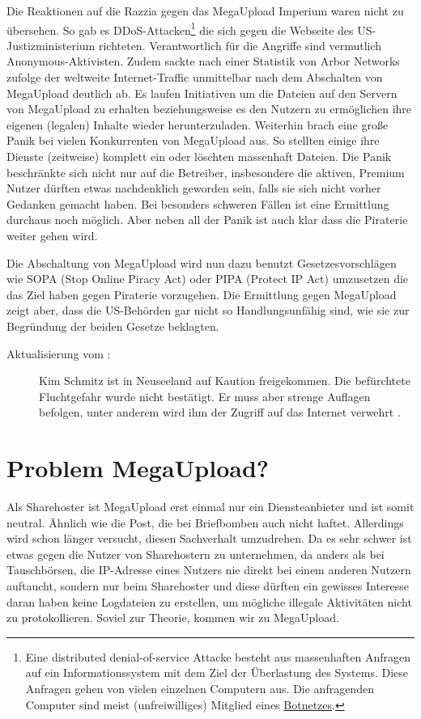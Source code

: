 Die Reaktionen auf die Razzia gegen das MegaUpload Imperium waren nicht zu übersehen. So gab es
DDoS-Attacken\footnote{Eine distributed denial-of-service Attacke besteht aus massenhaften Anfragen
auf ein Informationssystem mit dem Ziel der Überlastung des Systems. Diese Anfragen gehen von vielen
einzelnen Computern aus. Die anfragenden Computer sind meist (unfreiwilliges) Mitglied eines
\href{http://de.wikipedia.org/wiki/Botnet}{Botnetzes}.}
die sich gegen die Webseite des US-Justizministerium richteten. Verantwortlich für die Angriffe
sind vermutlich Anonymous-Aktivisten. Zudem
sackte nach einer Statistik von Arbor Networks zufolge der weltweite Internet-Traffic unmittelbar
nach dem Abschalten von MegaUpload deutlich ab\cite{arbornetworks:MegaUpload_shutdown_effect}.
Es laufen Initiativen um die Dateien auf den Servern
von MegaUpload zu erhalten beziehungsweise es den Nutzern zu ermöglichen ihre eigenen (legalen)
Inhalte wieder herunterzuladen. Weiterhin brach eine große Panik bei vielen Konkurrenten von
MegaUpload aus. So stellten einige ihre Dienste (zeitweise) komplett ein oder löschten massenhaft
Dateien. Die Panik
beschränkte sich nicht nur auf die Betreiber, insbesondere die aktiven, Premium Nutzer dürften etwas
nachdenklich geworden sein, falls sie sich nicht vorher Gedanken gemacht haben. Bei besonders
schweren Fällen ist eine Ermittlung durchaus noch möglich.
Aber neben all der Panik ist auch klar dass die Piraterie weiter gehen wird.

Die Abschaltung von MegaUpload wird nun dazu benutzt Gesetzesvorschlägen wie SOPA (Stop Online
Piracy Act) oder PIPA (Protect IP Act) umzusetzen die das Ziel haben gegen Piraterie vorzugehen.
Die Ermittlung gegen MegaUpload zeigt aber, dass die US-Behörden gar nicht so Handlungsunfähig
sind, wie sie zur Begründung der beiden Gesetze beklagten.

\begin{description}
	\item[Aktualisierung vom :] Kim Schmitz ist in Neuseeland auf Kaution
		freigekommen. Die befürchtete Fluchtgefahr wurde nicht bestätigt. Er muss aber strenge
		Auflagen befolgen, unter anderem wird ihm der Zugriff auf das Internet verwehrt
		\cite{golem:Kim_Frei,sueddeutsche:Kim_Frei}.
\end{description}

\section{Problem MegaUpload?}
Als Sharehoster ist MegaUpload erst einmal nur ein Diensteanbieter und ist somit neutral. Ähnlich
wie die Post, die bei Briefbomben auch nicht haftet. Allerdings wird schon länger versucht, diesen
Sachverhalt umzudrehen. Da es sehr schwer ist etwas gegen die Nutzer von Sharehostern zu
unternehmen, da anders als
bei Tauschbörsen, die IP-Adresse eines Nutzers nie
direkt bei einem anderen Nutzern auftaucht, sondern nur beim Sharehoster und diese dürften ein
gewisses
Interesse daran haben keine Logdateien zu erstellen, um mögliche illegale Aktivitäten nicht zu
protokollieren. Soviel zur Theorie, kommen wir zu MegaUpload.

